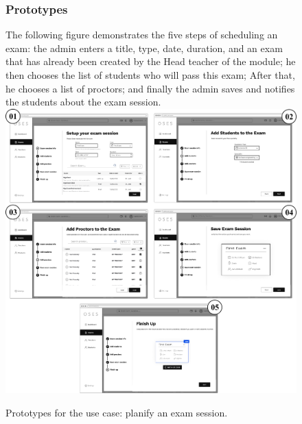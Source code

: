 \documentclass[]{uc2pfecaneva}
\begin{document}
    \begin{figure}
        \subsubsection{Prototypes}
        \raggedright The following figure demonstrates the five steps of scheduling an exam: the admin enters a title, type, date, duration, and an exam that has already been created by the Head teacher of the module; he then chooses the list of students who will pass this exam; After that, he chooses a list of proctors; and finally the admin saves and notifies the students about the exam session.
        \linebreak
        \includegraphics[width=\textwidth]{images/prototypes_create_exam_session}

        \caption{Prototypes for the use case: planify an exam session.}
    \end{figure}
    \clearpage
\end{document}
